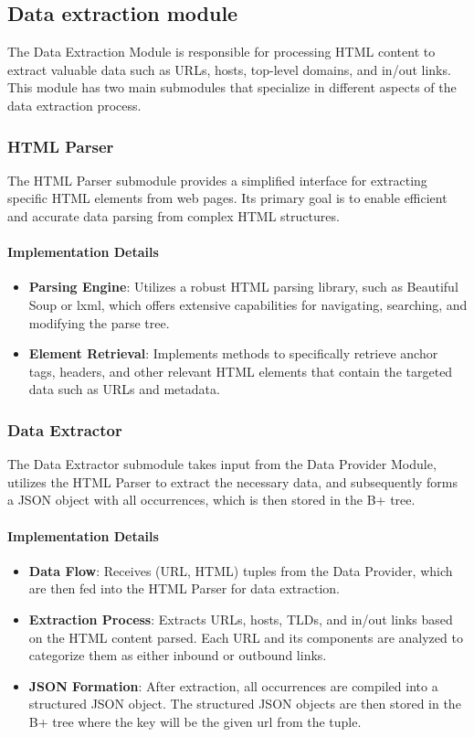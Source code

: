 \subsection{Data extraction module}
The Data Extraction Module is responsible for processing HTML content to extract valuable data such as URLs, hosts, top-level domains, and in/out links. This module has two main submodules that specialize in different aspects of the data extraction process.

\subsubsection{HTML Parser}
The HTML Parser submodule provides a simplified interface for extracting specific HTML elements from web pages. Its primary goal is to enable efficient and accurate data parsing from complex HTML structures.

\paragraph{Implementation Details}
\begin{itemize}
    \item \textbf{Parsing Engine}: Utilizes a robust HTML parsing library, such as Beautiful Soup or lxml, which offers extensive capabilities for navigating, searching, and modifying the parse tree.
    \item \textbf{Element Retrieval}: Implements methods to specifically retrieve anchor tags, headers, and other relevant HTML elements that contain the targeted data such as URLs and metadata.
\end{itemize}

\subsubsection{Data Extractor}
The Data Extractor submodule takes input from the Data Provider Module, utilizes the HTML Parser to extract the necessary data, and subsequently forms a JSON object with all occurrences, which is then stored in the B+ tree.

\paragraph{Implementation Details}
\begin{itemize}
    \item \textbf{Data Flow}: Receives (URL, HTML) tuples from the Data Provider, which are then fed into the HTML Parser for data extraction.
    \item \textbf{Extraction Process}: Extracts URLs, hosts, TLDs, and in/out links based on the HTML content parsed. Each URL and its components are analyzed to categorize them as either inbound or outbound links.
    \item \textbf{JSON Formation}: After extraction, all occurrences are compiled into a structured JSON object. The structured JSON objects are then stored in the B+ tree where the key will be the given url from the tuple.
\end{itemize}

